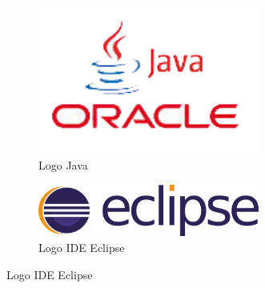 \documentclass[twoside,12pt]{report}
\begin{document}
\begin{figure}[h]
\begin{flushleft}
	\begin{subfigure}[]{.47\textwidth}
	\centering
	\includegraphics[width=0.8\textwidth]{img/java}
	\caption{Logo Java\cite{java}}
\end{subfigure}%
\end{flushleft}
\begin{flushright}
	\begin{subfigure}[]{.47\textwidth}
	\centering
	\includegraphics[width=0.8\textwidth]{img/eclipse}
	\caption{Logo IDE Eclipse\cite{eclipse}}	
	\end{subfigure}
\end{flushright}
\end{figure}
\end{document}
